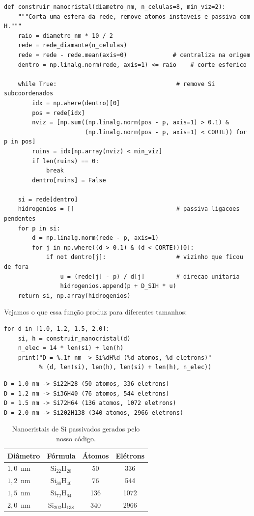\begin{lstlisting}[style=python,caption={Construindo o nanocristal passivado.},label={lst:construir}]
def construir_nanocristal(diametro_nm, n_celulas=8, min_viz=2):
    """Corta uma esfera da rede, remove atomos instaveis e passiva com H."""
    raio = diametro_nm * 10 / 2
    rede = rede_diamante(n_celulas)
    rede = rede - rede.mean(axis=0)             # centraliza na origem
    dentro = np.linalg.norm(rede, axis=1) <= raio    # corte esferico

    while True:                                  # remove Si subcoordenados
        idx = np.where(dentro)[0]
        pos = rede[idx]
        nviz = [np.sum((np.linalg.norm(pos - p, axis=1) > 0.1) &
                       (np.linalg.norm(pos - p, axis=1) < CORTE)) for p in pos]
        ruins = idx[np.array(nviz) < min_viz]
        if len(ruins) == 0:
            break
        dentro[ruins] = False

    si = rede[dentro]
    hidrogenios = []                             # passiva ligacoes pendentes
    for p in si:
        d = np.linalg.norm(rede - p, axis=1)
        for j in np.where((d > 0.1) & (d < CORTE))[0]:
            if not dentro[j]:                    # vizinho que ficou de fora
                u = (rede[j] - p) / d[j]         # direcao unitaria
                hidrogenios.append(p + D_SIH * u)
    return si, np.array(hidrogenios)
\end{lstlisting}

\noindent
Vejamos o que essa função produz para diferentes tamanhos:

\begin{lstlisting}[style=python]
for d in [1.0, 1.2, 1.5, 2.0]:
    si, h = construir_nanocristal(d)
    n_elec = 14 * len(si) + len(h)
    print("D = %.1f nm -> Si%dH%d (%d atomos, %d eletrons)"
          % (d, len(si), len(h), len(si) + len(h), n_elec))
\end{lstlisting}

\begin{lstlisting}[style=console]
D = 1.0 nm -> Si22H28 (50 atomos, 336 eletrons)
D = 1.2 nm -> Si36H40 (76 atomos, 544 eletrons)
D = 1.5 nm -> Si72H64 (136 atomos, 1072 eletrons)
D = 2.0 nm -> Si202H138 (340 atomos, 2966 eletrons)
\end{lstlisting}

\begin{table}[h]
  \centering
  \caption{Nanocristais de Si passivados gerados pelo nosso código.}
  \label{tab:nanocristais}
  \begin{tabular}{lccc}
    \toprule
    \textbf{Diâmetro} & \textbf{Fórmula} & \textbf{Átomos} & \textbf{Elétrons} \\
    \midrule
    $1{,}0$~nm & Si$_{22}$H$_{28}$   & 50  & 336 \\
    $1{,}2$~nm & Si$_{36}$H$_{40}$   & 76  & 544 \\
    $1{,}5$~nm & Si$_{72}$H$_{64}$   & 136 & 1072 \\
    $2{,}0$~nm & Si$_{202}$H$_{138}$ & 340 & 2966 \\
    \bottomrule
  \end{tabular}
\end{table}


